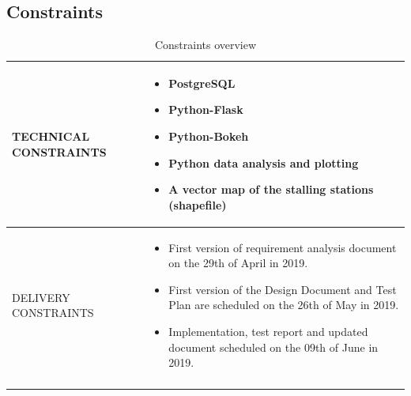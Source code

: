 \documentclass{article}
\begin{document}
\subsection{Constraints}
\begin{longtable}{|p{}|p{}|}
    
    \hline
    TECHNICAL CONSTRAINTS &         \begin{itemize}
                                    \item PostgreSQL
                                    \item Python-Flask 
                                    \item Python-Bokeh
                                    \item Python data analysis and plotting
                                    \item A vector map of the stalling stations (shapefile)
                                    \end{itemize}
                \\
    \hline
      DELIVERY CONSTRAINTS &        \begin{itemize}
                                    \item First version of requirement analysis document on the 29th of April in 2019.	
                                    \item First version of the Design Document and Test Plan are scheduled on the 26th of May in 2019.
                                    \item Implementation, test report and updated document scheduled on the 09th of June in 2019. 
                                    \end{itemize}
             \\
            \hline
\caption{Constraints overview} \\
\end{longtable}
\end{document}
